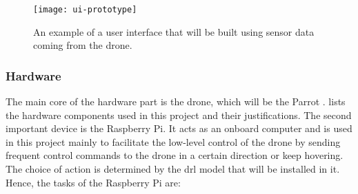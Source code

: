 \documentclass[../main.tex]{subfiles}
\begin{document}
\begin{figure}[tbp]
    \centering
    \texttt{[image: ui-prototype]}
    \caption{An example of a user interface that will be built
                using sensor data coming from the \anafi drone.}
    \label{fig:ui-prototype}
\end{figure}

\subsubsection{Hardware}

The main core of the hardware part is the drone, 
which will be the Parrot \anafi.
 lists the hardware components
used in this project and their justifications. 
The second important device is the Raspberry Pi. It
acts as an onboard computer and is used in this project
mainly to facilitate the low-level control of the drone
by sending frequent control commands to the drone
in a certain direction or keep hovering.
The choice of action is determined by the \gls{drl}
model that will be installed in it.
Hence, the tasks of the Raspberry Pi are:
\end{document}

